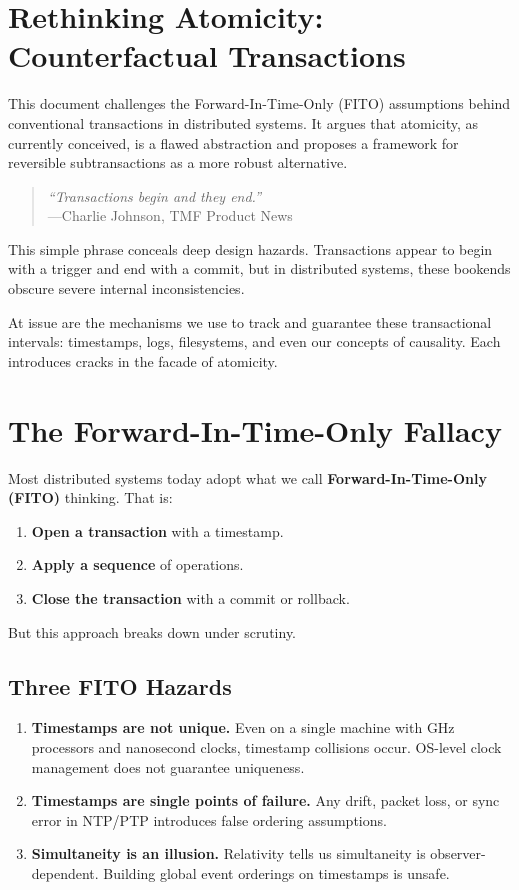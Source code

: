 \section{Rethinking Atomicity: Counterfactual Transactions}

This document challenges the Forward-In-Time-Only (FITO) assumptions behind conventional transactions in distributed systems. It argues that atomicity, as currently conceived, is a flawed abstraction and proposes a framework for reversible subtransactions as a more robust alternative.

\begin{quote}
\emph{“Transactions begin and they end.”}\\
\hspace*{0.5cm}---Charlie Johnson, TMF Product News
\end{quote}

This simple phrase conceals deep design hazards. Transactions appear to begin with a trigger and end with a commit, but in distributed systems, these bookends obscure severe internal inconsistencies. 

At issue are the mechanisms we use to track and guarantee these transactional intervals: timestamps, logs, filesystems, and even our concepts of causality. Each introduces cracks in the facade of atomicity.

\section{The Forward-In-Time-Only Fallacy}
Most distributed systems today adopt what we call \textbf{Forward-In-Time-Only (FITO)} thinking. That is:
\begin{enumerate}
  \item \textbf{Open a transaction} with a timestamp.
  \item \textbf{Apply a sequence} of operations.
  \item \textbf{Close the transaction} with a commit or rollback.
\end{enumerate}

But this approach breaks down under scrutiny.

\subsection*{Three FITO Hazards}
\begin{enumerate}
  \item \textbf{Timestamps are not unique.} Even on a single machine with GHz processors and nanosecond clocks, timestamp collisions occur. OS-level clock management does not guarantee uniqueness.
  \item \textbf{Timestamps are single points of failure.} Any drift, packet loss, or sync error in NTP/PTP introduces false ordering assumptions.
  \item \textbf{Simultaneity is an illusion.} Relativity tells us simultaneity is observer-dependent. Building global event orderings on timestamps is unsafe.
\end{enumerate}

